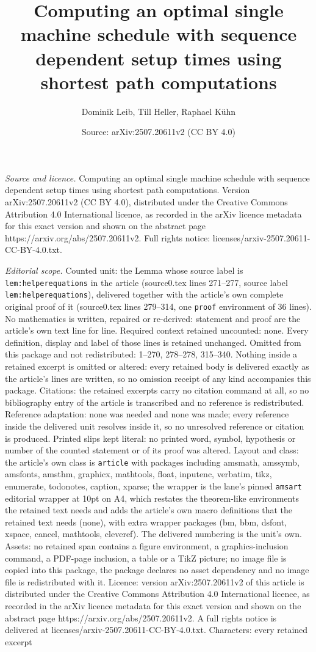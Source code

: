 \documentclass[10pt,a4paper]{amsart}
\title[Computing an optimal single machine schedule with sequence d]{Computing an optimal single machine schedule with sequence dependent setup times using shortest path computations}
\author{Dominik Leib, Till Heller, Raphael K\"uhn}
\date{Source: arXiv:2507.20611v2 (CC BY 4.0)}
\begin{document}
\maketitle

\noindent\emph{Source and licence.} Computing an optimal single machine schedule with sequence dependent setup times using shortest path computations. Version arXiv:2507.20611v2 (CC BY 4.0), distributed under the Creative Commons Attribution 4.0 International licence, as recorded in the arXiv licence metadata for this exact version and shown on the abstract page https://arxiv.org/abs/2507.20611v2. Full rights notice: licenses/arxiv-2507.20611-CC-BY-4.0.txt.\par\smallskip

\noindent\textit{Editorial scope.} Counted unit: the Lemma whose source label is \texttt{lem:helperequations} in the article (source0.tex lines 271--277, source label \texttt{lem:helperequations}), delivered together with the article's own complete original proof of it (source0.tex lines 279--314, one \texttt{proof} environment of 36 lines). No mathematics is written, repaired or re-derived: statement and proof are the article's own text line for line. Required context retained uncounted: none. Every definition, display and label of those lines is retained unchanged. Omitted from this package and not redistributed: 1--270, 278--278, 315--340. Nothing inside a retained excerpt is omitted or altered: every retained body is delivered exactly as the article's lines are written, so no omission receipt of any kind accompanies this package. Citations: the retained excerpts carry no citation command at all, so no bibliography entry of the article is transcribed and no reference is redistributed. Reference adaptation: none was needed and none was made; every reference inside the delivered unit resolves inside it, so no unresolved reference or citation is produced. Printed slips kept literal: no printed word, symbol, hypothesis or number of the counted statement or of its proof was altered. Layout and class: the article's own class is \texttt{article} with packages including amsmath, amssymb, amsfonts, amsthm, graphicx, mathtools, float, inputenc, verbatim, tikz, enumerate, todonotes, caption, xparse; the wrapper is the lane's pinned \texttt{amsart} editorial wrapper at 10pt on A4, which restates the theorem-like environments the retained text needs and adds the article's own macro definitions that the retained text needs (none), with extra wrapper packages (bm, bbm, dsfont, xspace, cancel, mathtools, cleveref). The delivered numbering is the unit's own. Assets: no retained span contains a figure environment, a graphics-inclusion command, a PDF-page inclusion, a table or a TikZ picture; no image file is copied into this package, the package declares no asset dependency and no image file is redistributed with it. Licence: version arXiv:2507.20611v2 of this article is distributed under the Creative Commons Attribution 4.0 International licence, as recorded in the arXiv licence metadata for this exact version and shown on the abstract page https://arxiv.org/abs/2507.20611v2. A full rights notice is delivered at licenses/arxiv-2507.20611-CC-BY-4.0.txt. Characters: every retained excerpt 
\end{document}
